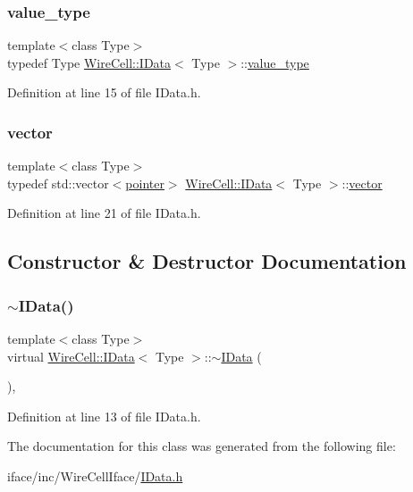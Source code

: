 \subsubsection{\texorpdfstring{value\+\_\+type}{value\_type}}
{\footnotesize\ttfamily template$<$class Type$>$ \\
typedef Type \hyperlink{class_wire_cell_1_1_i_data}{Wire\+Cell\+::\+I\+Data}$<$ Type $>$\+::\hyperlink{class_wire_cell_1_1_i_data_a8cd5758b536f009da111eefc54c20680}{value\+\_\+type}}



Definition at line 15 of file I\+Data.\+h.

\mbox{\label{class_wire_cell_1_1_i_data_ae1a9f863380499bb43f39fabb6276660}} 
\subsubsection{\texorpdfstring{vector}{vector}}
{\footnotesize\ttfamily template$<$class Type$>$ \\
typedef std\+::vector$<$\hyperlink{class_wire_cell_1_1_i_data_aff870b3ae8333cf9265941eef62498bc}{pointer}$>$ \hyperlink{class_wire_cell_1_1_i_data}{Wire\+Cell\+::\+I\+Data}$<$ Type $>$\+::\hyperlink{class_wire_cell_1_1_i_data_ae1a9f863380499bb43f39fabb6276660}{vector}}



Definition at line 21 of file I\+Data.\+h.



\subsection{Constructor \& Destructor Documentation}
\mbox{\label{class_wire_cell_1_1_i_data_a4973803d3325401af543a68d7e3e7707}} 
\subsubsection{\texorpdfstring{$\sim$\+I\+Data()}{~IData()}}
{\footnotesize\ttfamily template$<$class Type$>$ \\
virtual \hyperlink{class_wire_cell_1_1_i_data}{Wire\+Cell\+::\+I\+Data}$<$ Type $>$\+::$\sim$\hyperlink{class_wire_cell_1_1_i_data}{I\+Data} (\begin{DoxyParamCaption}{ }\end{DoxyParamCaption})\hspace{0.3cm}{\ttfamily [inline]}, {\ttfamily [virtual]}}



Definition at line 13 of file I\+Data.\+h.



The documentation for this class was generated from the following file\+:\begin{DoxyCompactItemize}
\item 
iface/inc/\+Wire\+Cell\+Iface/\hyperlink{_i_data_8h}{I\+Data.\+h}\end{DoxyCompactItemize}
